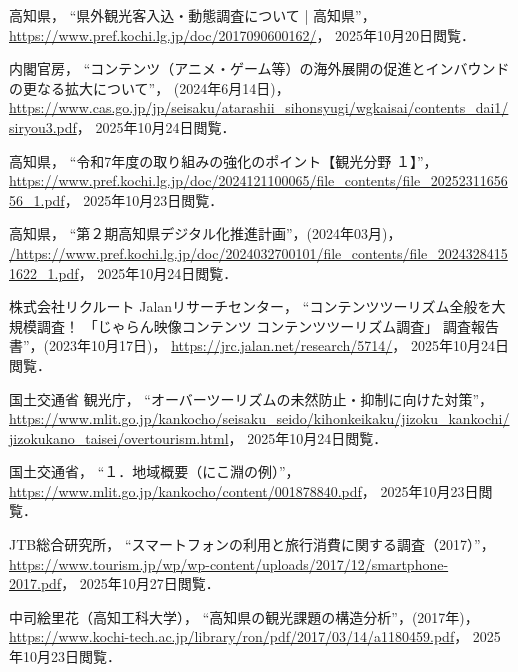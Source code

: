 \documentclass{docs}
\begin{document}
\begin{thebibliography}{99}
    高知県，
    “県外観光客入込・動態調査について | 高知県”，
    \url{https://www.pref.kochi.lg.jp/doc/2017090600162/}，
    2025年10月20日閲覧．

    内閣官房，
    “コンテンツ（アニメ・ゲーム等）の海外展開の促進とインバウンドの更なる拡大について”，
    (2024年6月14日)，
    \url{https://www.cas.go.jp/jp/seisaku/atarashii_sihonsyugi/wgkaisai/contents_dai1/siryou3.pdf}，
    2025年10月24日閲覧．

    高知県，
    “令和7年度の取り組みの強化のポイント【観光分野 １】”，
    \url{https://www.pref.kochi.lg.jp/doc/2024121100065/file_contents/file_2025231165656_1.pdf}，
    2025年10月23日閲覧．

    高知県，
    “第２期高知県デジタル化推進計画”，(2024年03月)，
    \url{/https://www.pref.kochi.lg.jp/doc/2024032700101/file_contents/file_20243284151622_1.pdf}，
    2025年10月24日閲覧．

    株式会社リクルート Jalanリサーチセンター，
    “コンテンツツーリズム全般を大規模調査！
	「じゃらん映像コンテンツ コンテンツツーリズム調査」
	調査報告書”，(2023年10月17日)，
    \url{https://jrc.jalan.net/research/5714/}，
    2025年10月24日閲覧．

    国土交通省 観光庁，
    “オーバーツーリズムの未然防止・抑制に向けた対策”，
    \url{https://www.mlit.go.jp/kankocho/seisaku_seido/kihonkeikaku/jizoku_kankochi/jizokukano_taisei/overtourism.html}，
    2025年10月24日閲覧．

    国土交通省，
    “１．地域概要（にこ淵の例）”，
    \url{https://www.mlit.go.jp/kankocho/content/001878840.pdf}，
    2025年10月23日閲覧．

	JTB総合研究所，
	“スマートフォンの利用と旅行消費に関する調査（2017）”，
	\url{https://www.tourism.jp/wp/wp-content/uploads/2017/12/smartphone-2017.pdf}，
	2025年10月27日閲覧．

    中司絵里花（高知工科大学），
    “高知県の観光課題の構造分析”，(2017年)，
    \url{https://www.kochi-tech.ac.jp/library/ron/pdf/2017/03/14/a1180459.pdf}，
    2025年10月23日閲覧．


\end{thebibliography}
\end{document}
